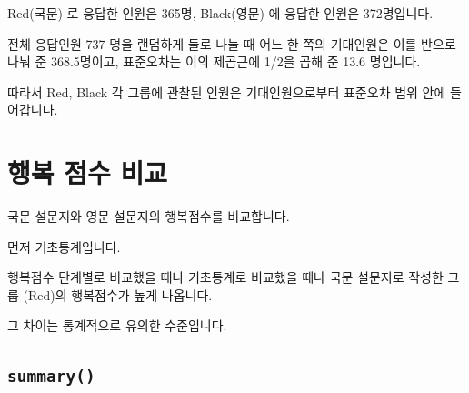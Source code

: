 \documentclass[
]{book}
\begin{document}
Red(국문) 로 응답한 인원은 365명, Black(영문) 에 응답한 인원은 372명입니다.

전체 응답인원 737 명을 랜덤하게 둘로 나눌 때 어느 한 쪽의 기대인원은 이를 반으로 나눠 준 368.5명이고, 표준오차는 이의 제곱근에 1/2을 곱해 준 13.6 명입니다.

따라서 Red, Black 각 그룹에 관찰된 인원은 기대인원으로부터 표준오차 범위 안에 들어갑니다.

\section{행복 점수 비교}\label{uxd589uxbcf5-uxc810uxc218-uxbe44uxad50}

국문 설문지와 영문 설문지의 행복점수를 비교합니다.

먼저 기초통계입니다.

행복점수 단계별로 비교했을 때나 기초통계로 비교했을 때나 국문 설문지로 작성한 그룹 (Red)의 행복점수가 높게 나옵니다.

그 차이는 통계적으로 유의한 수준입니다.

\subsection{\texorpdfstring{\texttt{summary()}}{summary()}}\label{summary-1}
\end{document}
